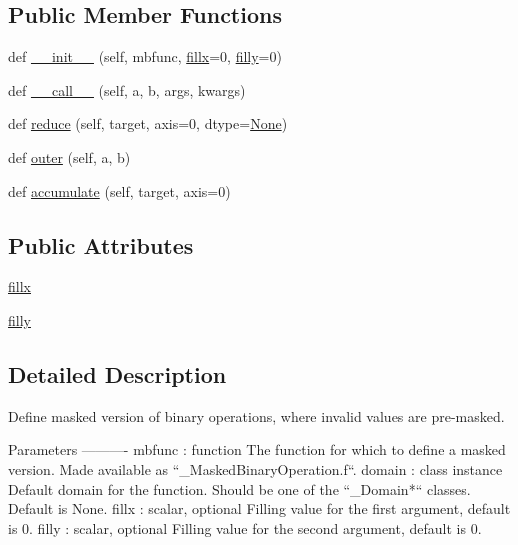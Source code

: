 \subsection*{Public Member Functions}
\begin{DoxyCompactItemize}
\item 
def \hyperlink{classnumpy_1_1ma_1_1core_1_1__MaskedBinaryOperation_afdb9dfe9d454b38298f08e18b20f4ce1}{\+\_\+\+\_\+init\+\_\+\+\_\+} (self, mbfunc, \hyperlink{classnumpy_1_1ma_1_1core_1_1__MaskedBinaryOperation_a61f16041049af788ed536efab9e6608c}{fillx}=0, \hyperlink{classnumpy_1_1ma_1_1core_1_1__MaskedBinaryOperation_ad368116f443eebd9a9db8d7d5eac8ec1}{filly}=0)
\item 
def \hyperlink{classnumpy_1_1ma_1_1core_1_1__MaskedBinaryOperation_aa97f7cd7d2c19a7be3653fe1980766ef}{\+\_\+\+\_\+call\+\_\+\+\_\+} (self, a, b, args, kwargs)
\item 
def \hyperlink{classnumpy_1_1ma_1_1core_1_1__MaskedBinaryOperation_a91abf0a92e6991b04f733cd25f02fb40}{reduce} (self, target, axis=0, dtype=\hyperlink{namespacenumpy_1_1ma_1_1core_a647ee1848dfa3692fe35a663a2aa40b3}{None})
\item 
def \hyperlink{classnumpy_1_1ma_1_1core_1_1__MaskedBinaryOperation_a86abbe489290548f1df13a93d012098d}{outer} (self, a, b)
\item 
def \hyperlink{classnumpy_1_1ma_1_1core_1_1__MaskedBinaryOperation_ae7f213b8b017a81797b2f513dc677a99}{accumulate} (self, target, axis=0)
\end{DoxyCompactItemize}
\subsection*{Public Attributes}
\begin{DoxyCompactItemize}
\item 
\hyperlink{classnumpy_1_1ma_1_1core_1_1__MaskedBinaryOperation_a61f16041049af788ed536efab9e6608c}{fillx}
\item 
\hyperlink{classnumpy_1_1ma_1_1core_1_1__MaskedBinaryOperation_ad368116f443eebd9a9db8d7d5eac8ec1}{filly}
\end{DoxyCompactItemize}


\subsection{Detailed Description}
\begin{DoxyVerb}Define masked version of binary operations, where invalid
values are pre-masked.

Parameters
----------
mbfunc : function
    The function for which to define a masked version. Made available
    as ``_MaskedBinaryOperation.f``.
domain : class instance
    Default domain for the function. Should be one of the ``_Domain*``
    classes. Default is None.
fillx : scalar, optional
    Filling value for the first argument, default is 0.
filly : scalar, optional
    Filling value for the second argument, default is 0.\end{DoxyVerb}
 

